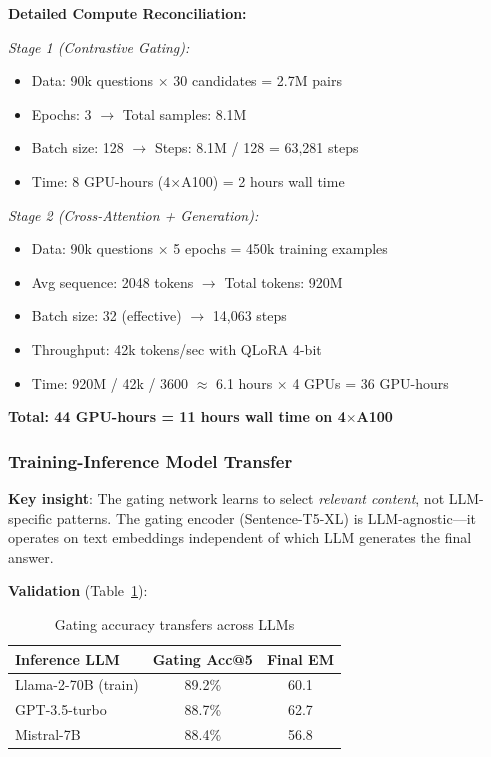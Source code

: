 \documentclass[10pt,twocolumn]{article}
\begin{document}
\textbf{Detailed Compute Reconciliation:}

\textit{Stage 1 (Contrastive Gating):}
\begin{itemize}
    \item Data: 90k questions $\times$ 30 candidates = 2.7M pairs
    \item Epochs: 3 $\rightarrow$ Total samples: 8.1M
    \item Batch size: 128 $\rightarrow$ Steps: 8.1M / 128 = 63,281 steps
    \item Time: 8 GPU-hours (4$\times$A100) = 2 hours wall time
\end{itemize}

\textit{Stage 2 (Cross-Attention + Generation):}
\begin{itemize}
    \item Data: 90k questions $\times$ 5 epochs = 450k training examples
    \item Avg sequence: 2048 tokens $\rightarrow$ Total tokens: 920M
    \item Batch size: 32 (effective) $\rightarrow$ 14,063 steps
    \item Throughput: 42k tokens/sec with QLoRA 4-bit
    \item Time: 920M / 42k / 3600 $\approx$ 6.1 hours $\times$ 4 GPUs = 36 GPU-hours
\end{itemize}

\textbf{Total: 44 GPU-hours = 11 hours wall time on 4$\times$A100}


\subsubsection{Training-Inference Model Transfer}
\label{sec:transfer}

\textbf{Key insight}: The gating network learns to select \textit{relevant content}, not LLM-specific patterns. The gating encoder (Sentence-T5-XL) is LLM-agnostic—it operates on text embeddings independent of which LLM generates the final answer.

\textbf{Validation} (Table~\ref{tab:transfer}):

\begin{table}[h]
\centering
\caption{Gating accuracy transfers across LLMs}
\label{tab:transfer}
\small
\begin{tabular}{@{}lcc@{}}
\toprule
\textbf{Inference LLM} & \textbf{Gating Acc@5} & \textbf{Final EM} \\
\midrule
Llama-2-70B (train) & 89.2\% & 60.1 \\
GPT-3.5-turbo & 88.7\% & 62.7 \\
Mistral-7B & 88.4\% & 56.8 \\
\bottomrule
\end{tabular}
\end{table}
\end{document}
